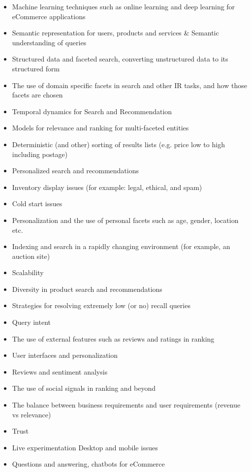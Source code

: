 \documentclass[sigconf]{acmart}
\begin{document}
\begin{itemize}
\item Machine learning techniques such as online learning and deep learning for eCommerce applications
\item Semantic representation for users, products and services \& Semantic understanding of queries
\item Structured data and faceted search, converting unstructured data to its structured form
\item The use of domain specific facets in search and other IR tasks, and how those facets are chosen
\item Temporal dynamics for Search and Recommendation
\item Models for relevance and ranking for multi-faceted entities
\item Deterministic (and other) sorting of results lists (e.g. price low to high including postage)
\item Personalized search and recommendations
\item Inventory display issues (for example: legal, ethical, and spam)
\item Cold start issues
\item Personalization and the use of personal facets such as age, gender, location etc.
\item Indexing and search in a rapidly changing environment (for example, an auction site)
\item Scalability 
\item Diversity in product search and recommendations
\item Strategies for resolving extremely low (or no) recall queries
\item Query intent
\item The use of external features such as reviews and ratings in ranking
\item User interfaces and personalization
\item Reviews and sentiment analysis
\item The use of social signals in ranking and beyond
\item The balance between business requirements and user requirements (revenue vs relevance)
\item Trust
\item Live experimentation Desktop and mobile issues
\item Questions and answering, chatbots for eCommerce
\end{itemize}
\end{document}
